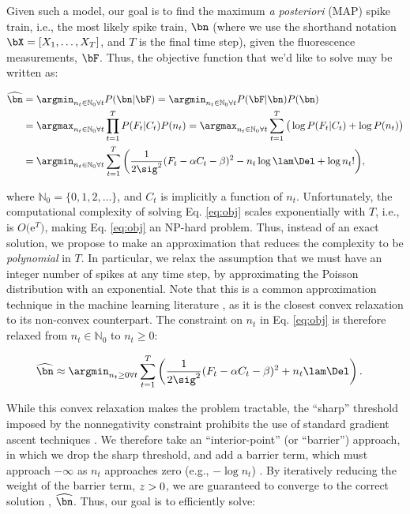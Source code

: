 Given such a model, our goal is to find the maximum \emph{a posteriori} (MAP) spike train, i.e., the most likely spike train, $\bn$ (where we use the shorthand notation $\bX=[X_1, \ldots, X_T]$, and $T$ is the final time step),  given the fluorescence measurements, $\bF$. %
Thus, the objective function that we'd like to solve may be written as:

\begin{align}
\hnm &=  \ann P(\bn | \bF) = \ann P(\bF | \bn) P(\bn) \nonumber  \\
&= \argmax_{n_t \in \mathbb{N}_0 \forall t} \prod_{t=1}^T  P(F_t | C_t)  P(n_t) = \argmax_{n_t \in \mathbb{N}_0 \forall t} \sum_{t=1}^T \big( \log P(F_t | C_t) + \log P(n_t)\big)  \nonumber \\
&= \ann  \sum_{t=1}^T \bigg( \frac{1}{2 \sig^2}(F_t - \alpha C_t - \beta)^2  -  n_t \log \lam \Del + \log n_t! \bigg),   \label{eq:obj}
\end{align}

\noindent where $\mathbb{N}_0 = \{0, 1, 2, \ldots\}$, and $C_t$ is implicitly a function of $n_t$.  Unfortunately, the computational complexity of solving Eq. \eqref{eq:obj} scales exponentially with $T$, i.e., is $O($e$^T)$, making Eq. \eqref{eq:obj} an NP-hard problem.  Thus, instead of an exact solution, we propose to make an approximation that reduces the complexity to be \emph{polynomial} in $T$.  In particular, we relax the assumption that we must have an integer number of spikes at any time step, by approximating the Poisson distribution with an exponential.  Note that this is a common approximation technique in the machine learning literature \cite{HastieFriedman01}, as it is the closest convex relaxation to its non-convex counterpart.  The constraint on $n_t$ in Eq. \eqref{eq:obj} is therefore relaxed from  $n_t \in \mathbb{N}_0$ to $n_t \geq 0$:

\begin{align} \label{eq:obj2}
\hnm &\approx \an  \sum_{t=1}^T \left( \frac{1}{2 \sig^2}(F_t -\alpha C_t - \beta)^2  +  n_t  \lam \Del \right).
\end{align}

While this convex relaxation makes the problem tractable, the ``sharp'' threshold imposed by the nonnegativity constraint prohibits the use of standard gradient ascent techniques \cite{CONV04}. We therefore take an ``interior-point'' (or ``barrier'') approach, in which we drop the sharp threshold, and add a barrier term, which must approach $-\infty$ as $n_t$ approaches zero (e.g., $-\log n_t$) \cite{CONV04}.  By iteratively reducing the weight of the barrier term, $z > 0$, we are guaranteed to converge to the correct solution \cite{CONV04}, $\hnm$.  Thus, our goal is to efficiently solve:

